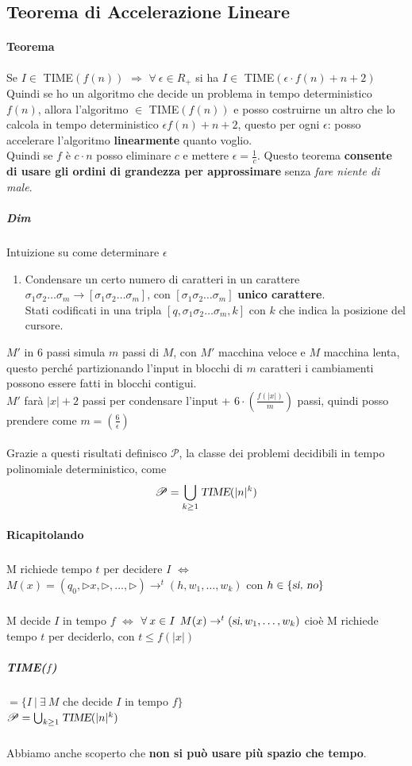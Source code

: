 \documentclass[10pt]{book}
\begin{document}
\subsection{Teorema di Accelerazione Lineare}
\paragraph{Teorema} Se $I \in$ TIME$(f(n))$ $\Rightarrow$ $\forall\: \epsilon \in R_+$ si ha $I\in$ TIME$(\epsilon\cdot f(n) + n + 2)$\\
Quindi se ho un algoritmo che decide un problema in tempo deterministico $f(n)$, allora l'algoritmo $\in$ TIME$(f(n))$ e posso costruirne un altro che lo calcola in tempo deterministico $\epsilon f(n) + n + 2$, questo per ogni $\epsilon$: posso accelerare l'algoritmo \textbf{linearmente} quanto voglio.\\
Quindi se $f$ è $c\cdot n$ posso eliminare $c$ e mettere $\epsilon = \frac{1}{c}$. Questo teorema \textbf{consente di usare gli ordini di grandezza per approssimare} senza \textit{fare niente di male}.
\subparagraph{Dim} Intuizione su come determinare $\epsilon$
\begin{enumerate}
	\item Condensare un certo numero di caratteri in un carattere\\
	$\sigma_1 \sigma_2 \ldots \sigma_m \longrightarrow [\sigma_1 \sigma_2 \ldots \sigma_m]$, con $[\sigma_1 \sigma_2 \ldots \sigma_m]$ \textbf{unico carattere}.\\
	Stati codificati in una tripla $[q, \sigma_1 \sigma_2 \ldots \sigma_m, k]$ con $k$ che indica la posizione del cursore.
\end{enumerate}
$M'$ in 6 passi simula $m$ passi di $M$, con $M'$ macchina veloce e $M$ macchina lenta, questo perché partizionando l'input in blocchi di $m$ caratteri i cambiamenti possono essere fatti in blocchi contigui.\\
$M'$ farà $|x|+2$ passi per condensare l'input + $6\cdot \left( \frac{f(|x|)}{m} \right)$ passi, quindi posso prendere come $m = \left( \frac{6}{\epsilon} \right)$\\\\
Grazie a questi risultati definisco $\mathscr{P}$, la classe dei problemi decidibili in tempo polinomiale deterministico, come $$\mathscr{P} = \bigcup_{k \geq 1} \textsl{TIME}(|n|^k) $$
\pagebreak
\paragraph{Ricapitolando}
\subparagraph{} M richiede tempo $t$ per decidere $I$ $\Leftrightarrow$ $M(x) = (q_0, \triangleright x, \triangleright, \ldots, \triangleright) \rightarrow^t (h, w_1, \ldots, w_k)$ con $h \in \{\textsl{si, no}\}$
\subparagraph{} M decide $I$ in tempo $f$ $\Leftrightarrow$ $\forall\:x\in I\:\:M(x) \rightarrow^t (\textsl{si}, w_1, \ldots, w_k)$ cioè M richiede tempo $t$ per deciderlo, con $t \leq f(|x|)$
\subparagraph{TIME($f$)} $=\{I\:|\:\exists\: M$ che decide $I$ in tempo $f\}$\\
$\mathscr{P} = \bigcup_{k \geq 1} \textsl{TIME}(|n|^k)$
\subparagraph{}Abbiamo anche scoperto che \textbf{non si può usare più spazio che tempo}.
\end{document}
